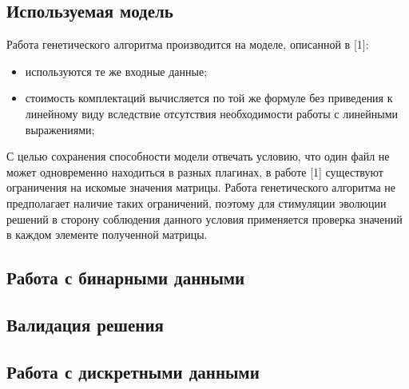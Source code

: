 
% 


\subsection*{Используемая модель}
Работа генетического алгоритма производится на моделе, описанной в [1]:
\begin{itemize}
  \item используются те же входные данные;
  \item стоимость комплектаций вычисляется по той же формуле без приведения к линейному виду вследствие отсутствия необходимости работы с линейными выражениями;
\end{itemize}

С целью сохранения способности модели отвечать условию, что один файл не может одновременно находиться в разных плагинах, в работе [1] существуют ограничения на искомые значения матрицы. Работа генетического алгоритма не предполагает наличие таких ограничений, поэтому для стимуляции эволюции решений в сторону соблюдения данного условия применяется проверка значений в каждом элементе полученной матрицы.

\subsection*{}

\subsection*{Работа с бинарными данными}

\subsection*{Валидация решения}

\subsection*{Работа с дискретными данными}

